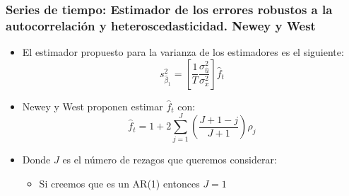 \documentclass{beamer}
\begin{document}
\begin{frame}[shrink=10]
\frametitle{Series de tiempo: Estimador de los errores robustos a la autocorrelación y heteroscedasticidad. Newey y West}

\begin{itemize}
  \item El estimador propuesto para la varianza de los estimadores es el siguiente:
  \[
  s^2_{\hat{\beta}_1} = \left[ \frac{1}{T} \frac{\sigma^2_{\hat{u}}}{\sigma^2_x} \right] \hat{f}_t
  \]
  \item Newey y West proponen estimar \(\hat{f}_t\) con:
  \[
  \hat{f}_t = 1 + 2 \sum_{j=1}^J \left( \frac{J + 1 - j}{J + 1} \right) \hat{\rho}_j
  \]
  \item Donde \(J\) es el número de rezagos que queremos considerar:
  \begin{itemize}
    \item Si creemos que es un AR(1) entonces \(J = 1\)
  \end{itemize}
\end{itemize}

\end{frame}
\end{document}
